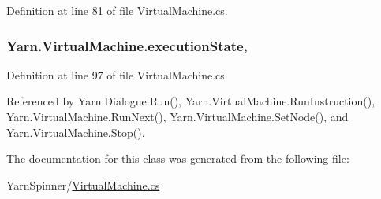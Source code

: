Definition at line 81 of file Virtual\-Machine.\-cs.

\hypertarget{a00156_a66491da06023dabfb63d09e6ccbba74f}{
\subsubsection[{execution\-State}]{ Yarn.\-Virtual\-Machine.\-execution\-State\hspace{0.3cm}{\ttfamily [get]}, {\ttfamily [set]}}}\label{a00156_a66491da06023dabfb63d09e6ccbba74f}


Definition at line 97 of file Virtual\-Machine.\-cs.



Referenced by Yarn.\-Dialogue.\-Run(), Yarn.\-Virtual\-Machine.\-Run\-Instruction(), Yarn.\-Virtual\-Machine.\-Run\-Next(), Yarn.\-Virtual\-Machine.\-Set\-Node(), and Yarn.\-Virtual\-Machine.\-Stop().



The documentation for this class was generated from the following file\-:\begin{DoxyCompactItemize}
\item 
Yarn\-Spinner/\hyperlink{a00304}{Virtual\-Machine.\-cs}\end{DoxyCompactItemize}
